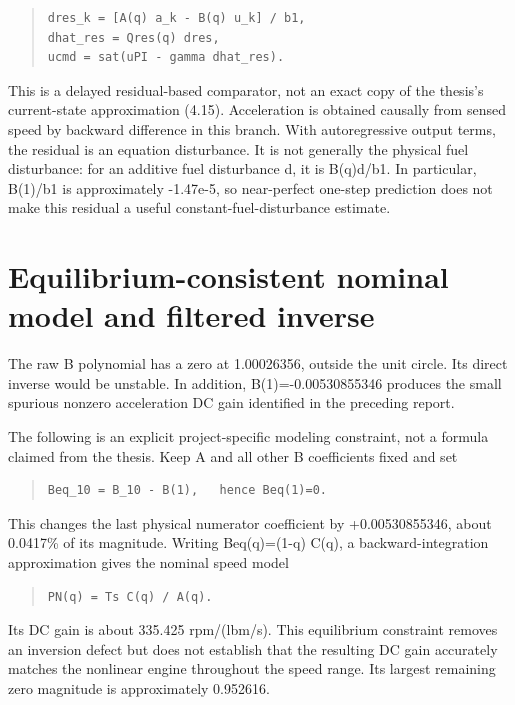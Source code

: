 \begin{quote}\footnotesize
\begin{verbatim}
dres_k = [A(q) a_k - B(q) u_k] / b1,
dhat_res = Qres(q) dres,
ucmd = sat(uPI - gamma dhat_res).
\end{verbatim}
\end{quote}
This is a delayed residual-based comparator, not an exact copy of the thesis's
current-state approximation (4.15). Acceleration is obtained causally from sensed
speed by backward difference in this branch. With autoregressive output terms,
the residual is an equation disturbance. It is not generally the physical fuel
disturbance: for an additive fuel disturbance d, it is B(q)d/b1. In particular,
B(1)/b1 is approximately -1.47e-5, so near-perfect one-step prediction does not
make this residual a useful constant-fuel-disturbance estimate.

\section{Equilibrium-consistent nominal model and filtered inverse}

The raw B polynomial has a zero at 1.00026356, outside the unit circle. Its direct
inverse would be unstable. In addition, B(1)=-0.00530855346 produces the small
spurious nonzero acceleration DC gain identified in the preceding report.

The following is an explicit project-specific modeling constraint, not a formula
claimed from the thesis. Keep A and all other B coefficients fixed and set

\begin{quote}\footnotesize
\begin{verbatim}
Beq_10 = B_10 - B(1),   hence Beq(1)=0.
\end{verbatim}
\end{quote}
This changes the last physical numerator coefficient by +0.00530855346, about
0.0417\% of its magnitude. Writing Beq(q)=(1-q) C(q), a backward-integration
approximation gives the nominal speed model

\begin{quote}\footnotesize
\begin{verbatim}
PN(q) = Ts C(q) / A(q).
\end{verbatim}
\end{quote}
Its DC gain is about 335.425 rpm/(lbm/s). This equilibrium constraint removes an
inversion defect but does not establish that the resulting DC gain accurately
matches the nonlinear engine throughout the speed range. Its largest remaining
zero magnitude is approximately 0.952616.

